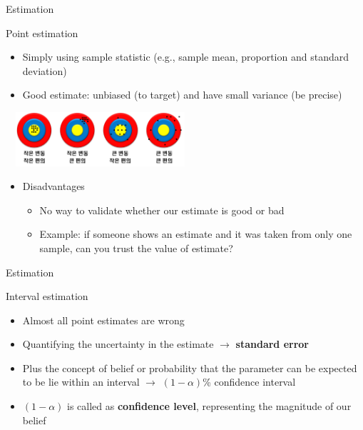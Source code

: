 \documentclass[9pt,ignorenonframetext,xcolor=dvipsnames]{beamer}
\providecommand{\tightlist}{%
  \setlength{\itemsep}{0pt}\setlength{\parskip}{0pt}}
\newlength{\wideitemsep}
\let\olditem\item
\renewcommand{\item}{\setlength{\itemsep}{\wideitemsep}\olditem}
\begin{document}
\begin{frame}{Estimation}

\begin{block}{Point estimation}

\begin{itemize}
\tightlist
\item
  Simply using sample statistic (e.g., sample mean, proportion and
  standard deviation)
\item
  Good estimate: unbiased (to target) and have small variance (be
  precise)
\end{itemize}

\begin{center}
  \includegraphics[width = 7cm, height = 2cm]{bias.png}
\end{center}

\begin{itemize}
\tightlist
\item
  Disadvantages

  \begin{itemize}
  \tightlist
  \item
    No way to validate whether our estimate is good or bad
  \item
    Example: if someone shows an estimate and it was taken from only one
    sample, can you trust the value of estimate?
  \end{itemize}
\end{itemize}

\end{block}

\end{frame}

\begin{frame}{Estimation}

\begin{block}{Interval estimation}

\begin{itemize}
\tightlist
\item
  Almost all point estimates are wrong
\item
  Quantifying the uncertainty in the estimate \(\rightarrow\)
  \textbf{standard error}
\item
  Plus the concept of belief or probability that the parameter can be
  expected to be lie within an interval \(\rightarrow\) \((1-\alpha)\)\%
  confidence interval
\item
  \((1-\alpha)\) is called as \textbf{confidence level}, representing
  the magnitude of our belief
\end{itemize}

\end{block}

\end{frame}
\end{document}
